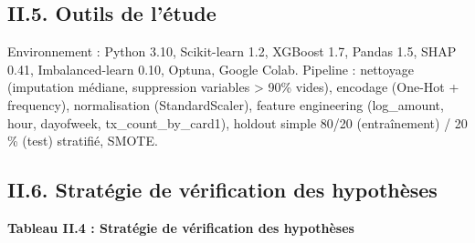 \documentclass[
  12pt,
]{article}
\begin{document}
\subsection{II.5. Outils de l’étude}\label{ii.5.-outils-de-luxe9tude}

Environnement : Python 3.10, Scikit-learn 1.2, XGBoost 1.7, Pandas 1.5,
SHAP 0.41, Imbalanced-learn 0.10, Optuna, Google Colab. Pipeline :
nettoyage (imputation médiane, suppression variables \textgreater{} 90\%
vides), encodage (One-Hot + frequency), normalisation (StandardScaler),
feature engineering (log\_amount, hour, dayofweek,
tx\_count\_by\_card1), holdout simple 80/20 (entraînement) / 20 \%
(test) stratifié, SMOTE.

\subsection{II.6. Stratégie de vérification des
hypothèses}\label{ii.6.-stratuxe9gie-de-vuxe9rification-des-hypothuxe8ses}

\textbf{Tableau II.4 : Stratégie de vérification des hypothèses}
\end{document}
